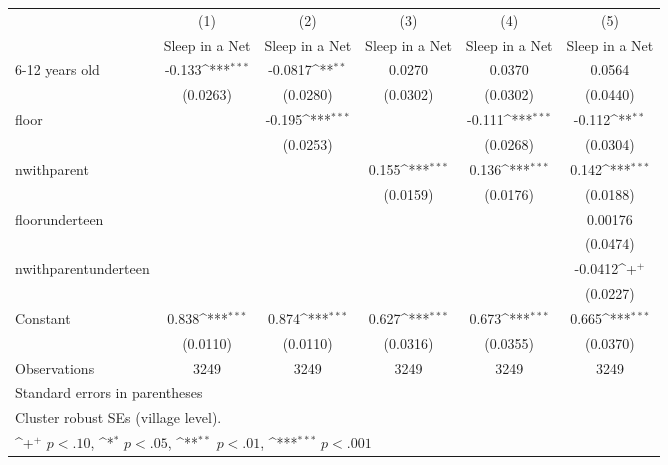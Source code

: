 {
\def\sym#1{\ifmmode^{#1}\else\(^{#1}\)\fi}
\begin{tabular}{l*{5}{c}}
\hline\hline
                    &\multicolumn{1}{c}{(1)}&\multicolumn{1}{c}{(2)}&\multicolumn{1}{c}{(3)}&\multicolumn{1}{c}{(4)}&\multicolumn{1}{c}{(5)}\\
                    &\multicolumn{1}{c}{Sleep in a Net}&\multicolumn{1}{c}{Sleep in a Net}&\multicolumn{1}{c}{Sleep in a Net}&\multicolumn{1}{c}{Sleep in a Net}&\multicolumn{1}{c}{Sleep in a Net}\\
\hline
6-12 years old      &      -0.133\sym{***}&     -0.0817\sym{**} &      0.0270         &      0.0370         &      0.0564         \\
                    &    (0.0263)         &    (0.0280)         &    (0.0302)         &    (0.0302)         &    (0.0440)         \\
[1em]
floor               &                     &      -0.195\sym{***}&                     &      -0.111\sym{***}&      -0.112\sym{**} \\
                    &                     &    (0.0253)         &                     &    (0.0268)         &    (0.0304)         \\
[1em]
nwithparent         &                     &                     &       0.155\sym{***}&       0.136\sym{***}&       0.142\sym{***}\\
                    &                     &                     &    (0.0159)         &    (0.0176)         &    (0.0188)         \\
[1em]
floorunderteen      &                     &                     &                     &                     &     0.00176         \\
                    &                     &                     &                     &                     &    (0.0474)         \\
[1em]
nwithparentunderteen&                     &                     &                     &                     &     -0.0412\sym{+}  \\
                    &                     &                     &                     &                     &    (0.0227)         \\
[1em]
Constant            &       0.838\sym{***}&       0.874\sym{***}&       0.627\sym{***}&       0.673\sym{***}&       0.665\sym{***}\\
                    &    (0.0110)         &    (0.0110)         &    (0.0316)         &    (0.0355)         &    (0.0370)         \\
\hline
Observations        &        3249         &        3249         &        3249         &        3249         &        3249         \\
\hline\hline
\multicolumn{6}{l}{\footnotesize Standard errors in parentheses}\\
\multicolumn{6}{l}{\footnotesize Cluster robust SEs (village level). }\\
\multicolumn{6}{l}{\footnotesize \sym{+} \(p<.10\), \sym{*} \(p<.05\), \sym{**} \(p<.01\), \sym{***} \(p<.001\)}\\
\end{tabular}
}
